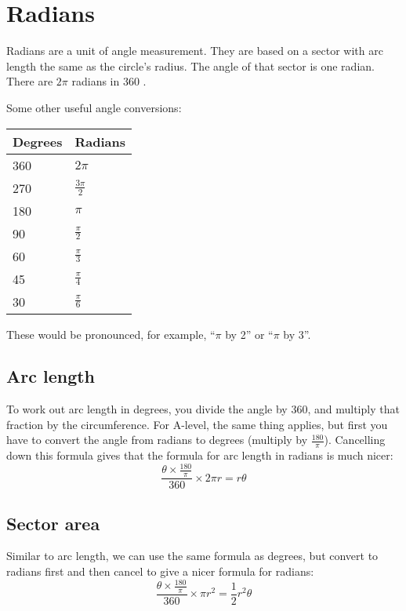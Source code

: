 \section{Radians}
Radians are a unit of angle measurement. They are based on a sector with arc length the same as the circle's radius. The angle of that sector is one radian. There are $2\pi$ radians in 360 \textdegree.

Some other useful angle conversions:
\begin{table}[ht]
\begin{tabular}{|l|l|}
\hline
Degrees & Radians          \\ \hline
360     & $2\pi$           \\ \hline
270     & $\frac{3\pi}{2}$ \\ \hline
180     & $\pi$            \\ \hline
90      & $\frac{\pi}{2}$  \\ \hline
60      & $\frac{\pi}{3}$  \\ \hline
45      & $\frac{\pi}{4}$  \\ \hline
30      & $\frac{\pi}{6}$  \\ \hline
\end{tabular}
\end{table}

These would be pronounced, for example, ``$\pi$ by 2'' or ``$\pi$ by 3''.

\subsection{Arc length}
To work out arc length in degrees, you divide the angle by 360, and multiply that fraction by the circumference. For A-level, the same thing applies, but first you have to convert the angle from radians to degrees (multiply by $\frac{180}{\pi}$). Cancelling down this formula gives that the formula for arc length in radians is much nicer:
\begin{equation}
	\frac{\theta \times \frac{180}{\pi}}{360}\times 2\pi r = r\theta
\end{equation}

\subsection{Sector area}
Similar to arc length, we can use the same formula as degrees, but convert to radians first and then cancel to give a nicer formula for radians:
\begin{equation}
	\frac{\theta \times \frac{180}{\pi}}{360}\times \pi r^2 = \frac{1}{2}r^2\theta
\end{equation}

